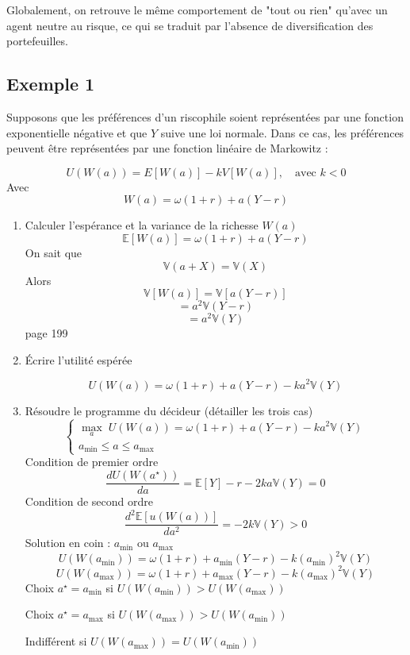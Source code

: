 \documentclass[a4paper, 12pt]{report}
\begin{document}
Globalement, on retrouve le même comportement de "tout ou rien" qu'avec un agent neutre au risque, ce qui se traduit par l'absence de diversification des portefeuilles.

\subsection{Exemple 1}

Supposons que les préférences d'un riscophile soient représentées par une fonction exponentielle négative et que \( Y \) suive une loi normale. Dans ce cas, les préférences peuvent être représentées par une fonction linéaire de Markowitz :

\[
U(W(a)) = E[W(a)] - kV[W(a)], \quad \text{avec } k < 0
\]
Avec
\[ W(a)=\omega(1+r)+a(Y-r) \]
\begin{enumerate}
	\item Calculer l'espérance et la variance de la richesse \( W(a) \)
\[ \mathbb{E}\left[W(a) \right]= \omega(1+r)+a(Y-r) \]
\noindent
On sait que 
\[ \mathbb{V}(a+X)=\mathbb{V}(X) \]
Alors
\[ \mathbb{V}\left[W(a) \right]=\mathbb{V}\left[ a(Y-r)\right]  \]
\[= a^2 \mathbb{V}(Y-r) \]
\[= a^2 \mathbb{V}(Y)\]
page 199
	\item Écrire l'utilité espérée
	
\[ U(W(a)) =  \omega(1+r)+a(Y-r) - ka^2 \mathbb{V}(Y) \]	
	
	\item Résoudre le programme du décideur (détailler les trois cas) 
\[
\begin{cases}
	\underset{a}\max \; U(W(a)) =  \omega(1+r)+a(Y-r) - ka^2 \mathbb{V}(Y) \\ a_{\text{min}} \leq a \leq a_{\text{max}}
\end{cases}
\]
Condition de premier ordre
\[
\frac{d U(W(a^{\star}))}{da} = \mathbb{E}[Y] - r -2ka \mathbb{V}(Y)= 0
\]
Condition de second ordre
\[
\frac{d^2 \mathbb{E}[u(W(a))]}{da^2} = -2k\mathbb{V}(Y) > 0
\]
Solution en coin : \( a_{\min} \) ou \( a_{\max} \)
\[ U\left(W(a_{\min}) \right)= \omega(1+r)+a_{\min}(Y-r) - k(a_{\min})^2 \mathbb{V}(Y)  \]
\[ U\left(W(a_{\max}) \right)= \omega(1+r)+a_{\max}(Y-r) - k(a_{\max})^2 \mathbb{V}(Y)  \]
Choix \( a^{\star} = a_{\min} \) si \( U\left(W(a_{\min})\right)> U\left(W(a_{\max}) \right) \)

\noindent
Choix \( a^{\star} = a_{\max} \) si \( U\left(W(a_{\max})\right)> U\left(W(a_{\min}) \right) \)

\noindent
Indifférent si \( U\left(W(a_{\max})\right)= U\left(W(a_{\min}) \right) \)
\end{enumerate}
\end{document}
